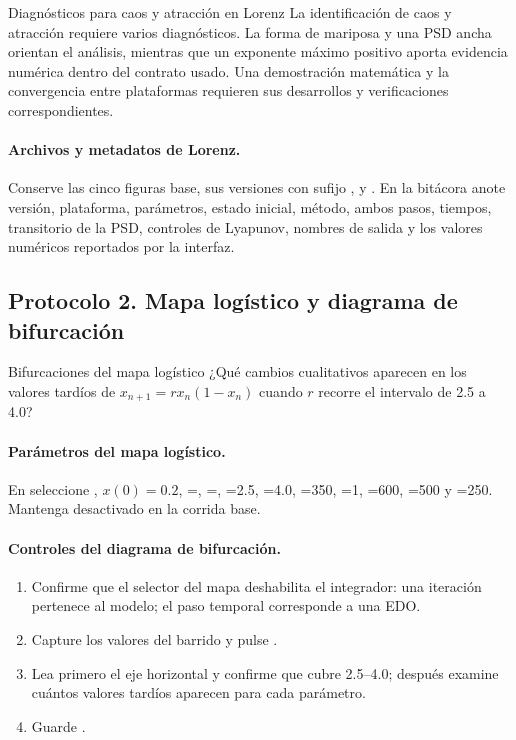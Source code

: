 \begin{cajaalerta}{Diagnósticos para caos y atracción en Lorenz}
La identificación de caos y atracción requiere varios diagnósticos. La forma de mariposa y una PSD ancha orientan el análisis, mientras que un exponente máximo positivo aporta evidencia numérica dentro del
contrato usado. Una demostración matemática y la convergencia entre plataformas
requieren sus desarrollos y verificaciones correspondientes.
\end{cajaalerta}

\paragraph{Archivos y metadatos de Lorenz.}
Conserve las cinco figuras base, sus versiones con sufijo
, y . En la bitácora anote
versión, plataforma, parámetros, estado inicial, método, ambos pasos, tiempos,
transitorio de la PSD, controles de Lyapunov, nombres de salida y los valores
numéricos reportados por la interfaz.

\subsection{Protocolo 2. Mapa logístico y diagrama de bifurcación}

\begin{cajaazul}{Bifurcaciones del mapa logístico}
¿Qué cambios cualitativos aparecen en los valores tardíos de
\(x_{n+1}=r x_n(1-x_n)\) cuando \(r\) recorre el intervalo de 2.5 a 4.0?
\end{cajaazul}

\paragraph{Parámetros del mapa logístico.}
En  seleccione ,
\(x(0)=0.2\), =,
=, =2.5,
=4.0, =350,
=1, =600,
=500 y =250.
Mantenga desactivado  en la corrida base.

\paragraph{Controles del diagrama de bifurcación.}
\begin{enumerate}
  \item Confirme que el selector del mapa deshabilita el integrador: una
  iteración pertenece al modelo; el paso temporal corresponde a una EDO.
  \item Capture los valores del barrido y pulse
  .
  \item Lea primero el eje horizontal y confirme que cubre 2.5--4.0; después
  examine cuántos valores tardíos aparecen para cada parámetro.
  \item Guarde .
\end{enumerate}


